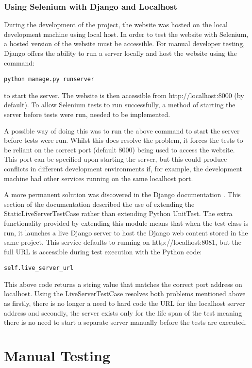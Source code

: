 \subsubsection{Using Selenium with Django and Localhost}
During the development of the project, the website was hosted on the local development machine using local host. In order to test the website with Selenium, a hosted version of the website must be accessible. For manual developer testing, Django offers the ability to run a server locally and host the website using the command: \begin{verbatim}
python manage.py runserver 
\end{verbatim}
to start the server. The website is then accessible from http://localhost:8000 (by default). To allow Selenium tests to run successfully, a method of starting the server before tests were run, needed to be implemented.

A possible way of doing this was to run the above command to start the server before tests were run. Whilst this does resolve the problem, it forces the tests to be reliant on the correct port (default 8000) being used to access the website. This port can be specified upon starting the server, but this could produce conflicts in different development environments if, for example, the development machine had other services running on the same localhost  port.

A more permanent solution was discovered in the Django documentation \cite{django_live_server_test}. This section of the documentation described the use of extending the StaticLiveServerTestCase rather than extending Python UnitTest. The extra functionality provided by extending this module means that when the test class is run, it launches a live Django server to host the Django web content stored in the same project. This service defaults to running on http://localhost:8081, but the full URL is accessible during test execution with the Python code:
\begin{verbatim}
self.live_server_url
\end{verbatim}
This above code returns a string value that matches the correct port address on localhost. Using the LiveServerTestCase resolves both problems mentioned above as firstly, there is no longer a need to hard code the URL for the localhost server address and secondly, the server exists only for the life span of the test meaning there is no need to start a separate server manually before the tests are executed.

\section{Manual Testing}
